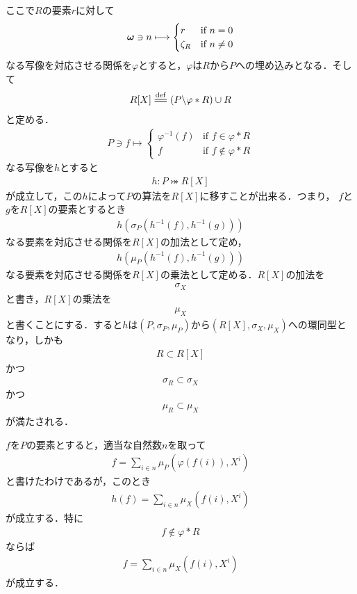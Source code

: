 	ここで$R$の要素$r$に対して
	\begin{align}
		{\boldsymbol \omega} \ni n \longmapsto
		\begin{cases}
			r & \mbox{if } n = 0 \\
			\zeta_R & \mbox{if } n \neq 0
		\end{cases}
	\end{align}
	なる写像を対応させる関係を$\varphi$とすると，$\varphi$は$R$から$P$への埋め込みとなる．そして
	\begin{align}
		R[X] \defeq \left(P \backslash \varphi \ast R\right) \cup R
	\end{align}
	と定める．
	\begin{align}
		P \ni f \longmapsto
		\begin{cases}
			\varphi^{-1}(f) & \mbox{if } f \in \varphi \ast R \\
			f & \mbox{if } f \notin \varphi \ast R
		\end{cases}
	\end{align}
	なる写像を$h$とすると
	\begin{align}
		h:P \bij R[X]
	\end{align}
	が成立して，この$h$によって$P$の算法を$R[X]$に移すことが出来る．つまり，
	$f$と$g$を$R[X]$の要素とするとき
	\begin{align}
		h\left( \sigma_P\left(h^{-1}(f),h^{-1}(g)\right) \right)
	\end{align}
	なる要素を対応させる関係を$R[X]$の加法として定め，
	\begin{align}
		h\left( \mu_P\left(h^{-1}(f),h^{-1}(g)\right) \right)
	\end{align}
	なる要素を対応させる関係を$R[X]$の乗法として定める．$R[X]$の加法を
	\begin{align}
		\sigma_X
	\end{align}
	と書き，$R[X]$の乗法を
	\begin{align}
		\mu_X
	\end{align}
	と書くことにする．すると$h$は$(P,\sigma_P,\mu_P)$から$(R[X],\sigma_X,\mu_X)$への環同型となり，しかも
	\begin{align}
		R \subset R[X]
	\end{align}
	かつ
	\begin{align}
		\sigma_R \subset \sigma_X
	\end{align}
	かつ
	\begin{align}
		\mu_R \subset \mu_X
	\end{align}
	が満たされる．
	
	$f$を$P$の要素とすると，適当な自然数$n$を取って
	\begin{align}
		f = \sum_{i \in n} \mu_P \left(\varphi(f(i)),X^i\right)
	\end{align}
	と書けたわけであるが，このとき
	\begin{align}
		h(f) = \sum_{i \in n} \mu_X \left(f(i),X^i\right)
	\end{align}
	が成立する．特に
	\begin{align}
		f \notin \varphi \ast R
	\end{align}
	ならば
	\begin{align}
		f = \sum_{i \in n} \mu_X \left(f(i),X^i\right)
	\end{align}
	が成立する．
	
